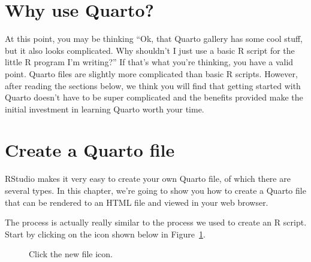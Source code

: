 \documentclass[
  letterpaper,
  DIV=11,
  numbers=noendperiod]{scrreprt}
\begin{document}
\section{Why use Quarto?}\label{why-use-quarto}

At this point, you may be thinking ``Ok, that Quarto gallery has some
cool stuff, but it also looks complicated. Why shouldn't I just use a
basic R script for the little R program I'm writing?'' If that's what
you're thinking, you have a valid point. Quarto files are slightly more
complicated than basic R scripts. However, after reading the sections
below, we think you will find that getting started with Quarto doesn't
have to be super complicated and the benefits provided make the initial
investment in learning Quarto worth your time.

\section{Create a Quarto file}\label{create-a-quarto-file}

RStudio makes it very easy to create your own Quarto file, of which
there are several types. In this chapter, we're going to show you how to
create a Quarto file that can be rendered to an HTML file and viewed in
your web browser.

The process is actually really similar to the process we used to create
an R script. Start by clicking on the icon shown below in
Figure~\ref{fig-new-quarto-document-01}.

\begin{figure}


\caption{\label{fig-new-quarto-document-01}Click the new file icon.}

\end{figure}%
\end{document}
